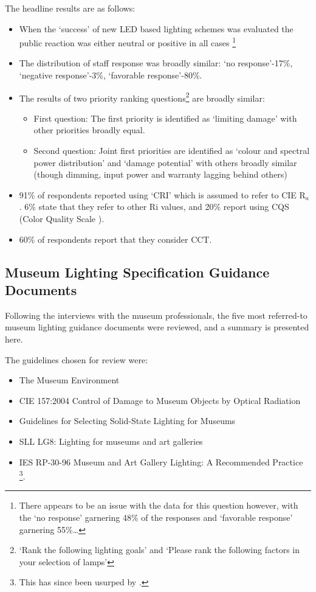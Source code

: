 \noindent
The headline results are as follows:
\begin{itemize}
    \item When the `success' of new \gls{LED} based lighting schemes was evaluated the public reaction was either neutral or positive in all cases \footnote{There appears to be an issue with the data for this question however, with the `no response' garnering 48\% of the responses and `favorable response' garnering 55\%\dots}
    \item The distribution of staff response was broadly similar: `no response'-17\%, `negative response'-3\%, `favorable response'-80\%.
    \item The results of two priority ranking questions\footnote{`Rank the following lighting goals' and `Please rank the following factors in your selection of lamps'} are broadly similar:
    \begin{itemize}
        \item First question: The first priority is identified as `limiting damage' with other priorities broadly equal.
        \item Second question: Joint first priorities are identified as `colour and spectral power distribution' and `damage potential' with others broadly similar (though dimming, input power and warranty lagging behind others)
    \end{itemize}
    \item 91\% of respondents reported using `\gls{CRI}' which is assumed to refer to \gls{CIE} R$_a$. 6\% state that they refer to other Ri values, and 20\% report using CQS (Color Quality Scale \citep{ohno_rationale_2010,davis_color_2010}).
    \item 60\% of respondents report that they consider \gls{CCT}.
\end{itemize} 

\subsection{Museum Lighting Specification Guidance Documents}

Following the interviews with the museum professionals, the five most referred-to museum lighting guidance documents were reviewed, and a summary is presented here.

\noindent
The guidelines chosen for review were:
\begin{itemize}
\item The Museum Environment \citep{thomson_museum_1986}
\item \gls{CIE} 157:2004 Control of Damage to Museum Objects by Optical Radiation \citep{cie_cie_2004}
\item Guidelines for Selecting Solid-State Lighting for Museums \citep{druzik_guidelines_2012}
\item SLL LG8: Lighting for museums and art galleries \citep{cibse_lighting_2015}
\item IES RP-30-96 Museum and Art Gallery Lighting: A Recommended Practice \citep{ies_ies_1996}\footnote{This has since been usurped by \citet{illuminating_engineering_society_ies_2017}.}.
\end{itemize}

